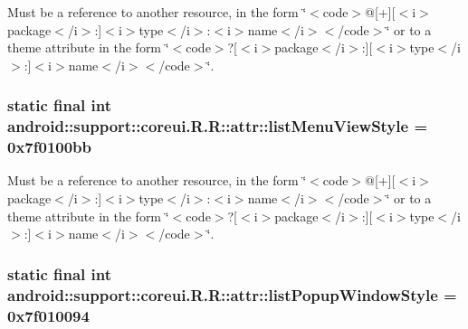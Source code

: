 Must be a reference to another resource, in the form \char`\"{}$<$code$>$@\mbox{[}+\mbox{]}\mbox{[}$<$i$>$package$<$/i$>$:\mbox{]}$<$i$>$type$<$/i$>$:$<$i$>$name$<$/i$>$$<$/code$>$\char`\"{} or to a theme attribute in the form \char`\"{}$<$code$>$?\mbox{[}$<$i$>$package$<$/i$>$:\mbox{]}\mbox{[}$<$i$>$type$<$/i$>$:\mbox{]}$<$i$>$name$<$/i$>$$<$/code$>$\char`\"{}. \hypertarget{classandroid_1_1support_1_1coreui_1_1_r_1_1attr_711560a101b1aad5db21c8fe013d33cd}{
\subsubsection[{listMenuViewStyle}]{\setlength{\rightskip}{0pt plus 5cm}static final int android::support::coreui.R.R::attr::listMenuViewStyle = 0x7f0100bb}}
\label{classandroid_1_1support_1_1coreui_1_1_r_1_1attr_711560a101b1aad5db21c8fe013d33cd}


Must be a reference to another resource, in the form \char`\"{}$<$code$>$@\mbox{[}+\mbox{]}\mbox{[}$<$i$>$package$<$/i$>$:\mbox{]}$<$i$>$type$<$/i$>$:$<$i$>$name$<$/i$>$$<$/code$>$\char`\"{} or to a theme attribute in the form \char`\"{}$<$code$>$?\mbox{[}$<$i$>$package$<$/i$>$:\mbox{]}\mbox{[}$<$i$>$type$<$/i$>$:\mbox{]}$<$i$>$name$<$/i$>$$<$/code$>$\char`\"{}. \hypertarget{classandroid_1_1support_1_1coreui_1_1_r_1_1attr_c06d1f0c0cbdf4e00d0f601e201fefd0}{
\subsubsection[{listPopupWindowStyle}]{\setlength{\rightskip}{0pt plus 5cm}static final int android::support::coreui.R.R::attr::listPopupWindowStyle = 0x7f010094}}
\label{classandroid_1_1support_1_1coreui_1_1_r_1_1attr_c06d1f0c0cbdf4e00d0f601e201fefd0}


